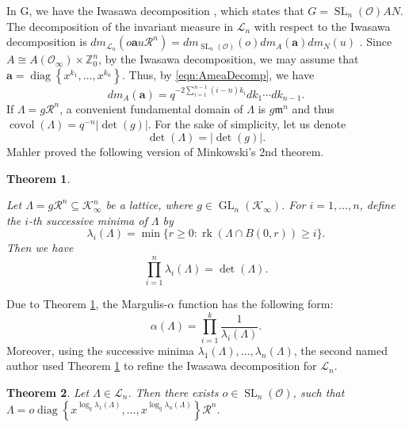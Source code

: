 \documentclass[11pt,a4paper,reqno]{amsart}
\newtheorem{theorem}{Theorem}[section]
\theoremstyle{definition}
\theoremstyle{remark}
\numberwithin{equation}{section}
\begin{document}
In $\mathrm{G}$, we have the Iwasawa decomposition \cite{BT,Casselman,A}, which states that $G=\operatorname{SL}_n(\mathcal{O})AN$. The decomposition of the invariant measure in $\mathcal{L}_n$ with respect to the Iwasawa decomposition is $dm_{\mathcal{L}_n}(o\mathbf{a}u\mathcal{R}^n)=dm_{\operatorname{SL}_n(\mathcal{O})}(o)dm_A(\mathbf{a})dm_N(u)$ \cite{Casselman,PR,BT}. Since $A\cong A(\mathcal{O}_{\infty})\times \mathbb{Z}_0^n$, by the Iwasawa decomposition, we may assume that $\mathbf{a}=\operatorname{diag}\left\{x^{k_1},\dots,x^{k_n}\right\}$. Thus, by \eqref{eqn:AmeaDecomp}, we have
\begin{equation}\label{eqn:AmeaDecompNewCoors}
dm_A(\mathbf{a})=q^{-2\sum_{i=1}^{n-1}(i-n)k_i}dk_1\cdots dk_{n-1}.
\end{equation}
If $\Lambda=g\mathcal{R}^n$, a convenient fundamental domain of $\Lambda$ is $g\mathfrak{m}^n$ and thus $\operatorname{covol}(\Lambda)=q^{-n}\vert \det(g)\vert$. For the sake of simplicity, let us denote $$\det(\Lambda)=\vert \det(g)\vert.$$ Mahler \cite[Equations (24) and (25)]{Mah} proved the following version of Minkowski's 2nd theorem.
\begin{theorem}
    \label{thm:Mink2nd}

    Let $\Lambda=g\mathcal{R}^n\subseteq \mathcal{K}_{\infty}^n$ be a lattice, where $g\in \operatorname{GL}_n(\mathcal{K}_{\infty})$. For $i=1,\dots,n$, define the $i$-th successive minima of $\Lambda$ by
    $$\lambda_i(\Lambda)=\min\{r\geq 0:\operatorname{rk}\left(\Lambda\cap B(0,r)\right)\geq i\}.$$
    Then we have
    \begin{equation}
        \prod_{i=1}^n\lambda_i(\Lambda)=\det(\Lambda).
    \end{equation}
\end{theorem}
Due to Theorem \ref{thm:Mink2nd}, the Margulis-$\alpha$ function has the following form:
\begin{equation}
\label{eqn:alphaFuncForm}
\alpha(\Lambda)=\prod_{i=1}^k\frac{1}{\lambda_i(\Lambda)}.\end{equation}
Moreover, using the successive minima $\lambda_1(\Lambda),\dots,\lambda_n(\Lambda)$, the second named author \cite{A} used Theorem \ref{thm:Mink2nd} to refine the Iwasawa decomposition for $\mathcal{L}_n$.
\begin{theorem}{\cite[Theorem 1.24]{A}}
\label{thm:LattKAN}
    Let $\Lambda\in \mathcal{L}_n$. Then there exists $o\in \operatorname{SL}_n(\mathcal{O})$, such that $\Lambda=o\operatorname{diag}\left\{x^{\log_q\lambda_1(\Lambda)},\dots,x^{\log_q\lambda_n(\Lambda)}\right\}\mathcal{R}^n$.
\end{theorem}
\end{document}
